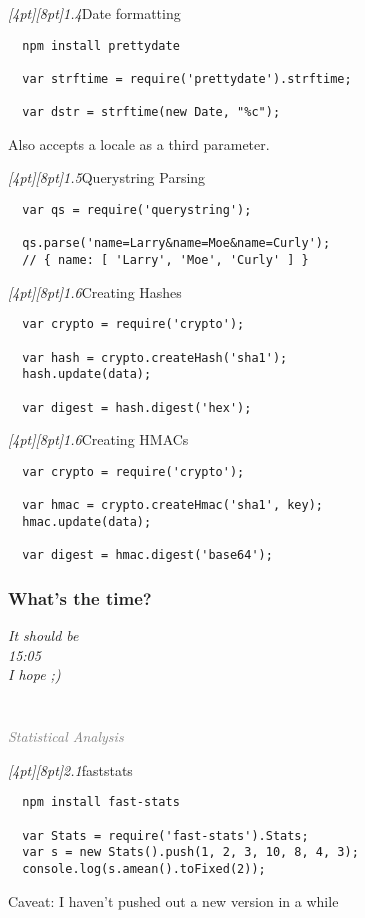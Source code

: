 \documentclass{beamer}
\newcommand{\sn}[1]{\textrm{\textit{\Huge{\raisebox{-3pt}[4pt][8pt]{\textcolor{f2elblue}{#1}}}}}\hspace{4pt}}
\newcommand{\innersplash}[1]{
  \begin{center}
    \large \textrm{\textit{ #1 } }
  \end{center}
}
\newcommand{\splashslide}[2][{}]{
  \begin{frame}
  \frametitle{#1}
  \innersplash{#2}
  \end{frame}
}
\newcommand{\leadinslide}[2]{
  \splashslide{
     {\fontsize{150}{20}\selectfont{\raisebox{0pt}[90pt][0pt]{\textcolor{light-gray}{#1}}}} \\ \huge \textcolor{gray}{#2}
  }
}
\begin{document}
\begin{frame}[fragile]{\sn{1.4}Date formatting}
\begin{verbatim}
  npm install prettydate

  var strftime = require('prettydate').strftime;

  var dstr = strftime(new Date, "%c");
\end{verbatim}
Also accepts a locale as a third parameter.
\end{frame}

\begin{frame}[fragile]{\sn{1.5}Querystring Parsing}
\begin{verbatim}
  var qs = require('querystring');

  qs.parse('name=Larry&name=Moe&name=Curly');
  // { name: [ 'Larry', 'Moe', 'Curly' ] }
\end{verbatim}
\end{frame}

\begin{frame}[fragile]{\sn{1.6}Creating Hashes}
\begin{verbatim}
  var crypto = require('crypto');

  var hash = crypto.createHash('sha1');
  hash.update(data);

  var digest = hash.digest('hex');
\end{verbatim}
\end{frame}

\begin{frame}[fragile]{\sn{1.6}Creating HMACs}
\begin{verbatim}
  var crypto = require('crypto');

  var hmac = crypto.createHmac('sha1', key);
  hmac.update(data);

  var digest = hmac.digest('base64');
\end{verbatim}
\end{frame}

\splashslide[What's the time?]{\LARGE It should be \\ 15:05 \\ \small I hope ;) }

\leadinslide{2}{Statistical Analysis}

\begin{frame}[fragile]{\sn{2.1}faststats}
\begin{verbatim}
  npm install fast-stats

  var Stats = require('fast-stats').Stats;
  var s = new Stats().push(1, 2, 3, 10, 8, 4, 3);
  console.log(s.amean().toFixed(2));
\end{verbatim}
Caveat: I haven't pushed out a new version in a while
\end{frame}
\end{document}
